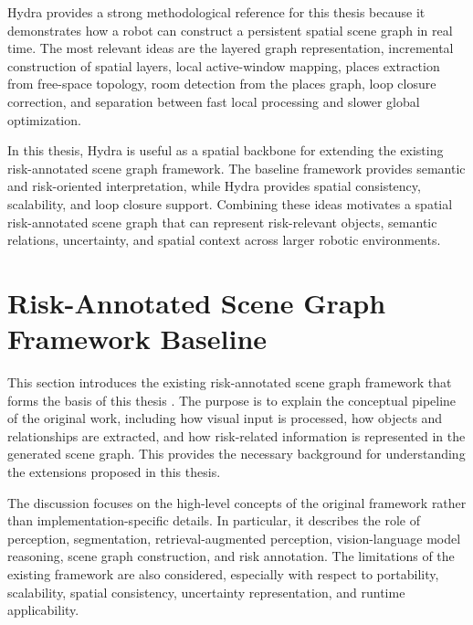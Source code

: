 {\small

Hydra provides a strong methodological reference for this thesis because it demonstrates how a robot can construct a persistent spatial scene graph in real time. The most relevant ideas are the layered graph representation, incremental construction of spatial layers, local active-window mapping, places extraction from free-space topology, room detection from the places graph, loop closure correction, and separation between fast local processing and slower global optimization.

In this thesis, Hydra is useful as a spatial backbone for extending the existing risk-annotated scene graph framework. The baseline framework provides semantic and risk-oriented interpretation, while Hydra provides spatial consistency, scalability, and loop closure support. Combining these ideas motivates a spatial risk-annotated scene graph that can represent risk-relevant objects, semantic relations, uncertainty, and spatial context across larger robotic environments.

}










\section{Risk-Annotated Scene Graph Framework Baseline}

{\small

This section introduces the existing risk-annotated scene graph framework that forms the basis of this thesis \cite{previous_rsg_thesis}. The purpose is to explain the conceptual pipeline of the original work, including how visual input is processed, how objects and relationships are extracted, and how risk-related information is represented in the generated scene graph. This provides the necessary background for understanding the extensions proposed in this thesis.

The discussion focuses on the high-level concepts of the original framework rather than implementation-specific details. In particular, it describes the role of perception, segmentation, retrieval-augmented perception, vision-language model reasoning, scene graph construction, and risk annotation. The limitations of the existing framework are also considered, especially with respect to portability, scalability, spatial consistency, uncertainty representation, and runtime applicability.

}

